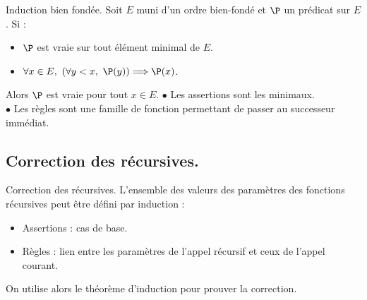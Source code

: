\documentclass[french, 11pt]{article}
\begin{document}
\begin{corr}{Induction bien fondée.}{}
    Soit $E$ muni d'un ordre bien-fondé et $\P$ un prédicat sur $E$. Si :
    \begin{itemize}[topsep=0pt,itemsep=-0.9 ex]
        \item $\P$ est vraie sur tout élément minimal de $E$.
        \item $\forall x\in E, ~ (\forall y<x, ~ \P(y)) \Longrightarrow \P(x)$.
    \end{itemize}
    Alors $\P$ est vraie pour tout $x\in E$.
    \tcblower
    $\bullet$ Les assertions sont les minimaux.\\
    $\bullet$ Les règles sont une famille de fonction permettant de passer au successeur immédiat.
\end{corr}

\subsection{Correction des récursives.}

\begin{meth}{Correction des récursives.}{}
    L'ensemble des valeurs des paramètres des fonctions récursives peut être défini par induction :
    \begin{itemize}[topsep=0pt,itemsep=-0.9 ex]
        \item Assertions : cas de base.
        \item Règles : lien entre les paramètres de l'appel récursif et ceux de l'appel courant.
    \end{itemize}
    On utilise alors le théorème d'induction pour prouver la correction.
\end{meth}
\end{document}
